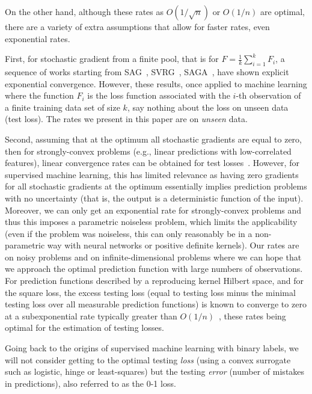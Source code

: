 \documentclass[final]{colt2018} %
\begin{document}
On the other hand, although these rates as $O(1/\sqrt{n})$ or $O(1/n)$ are optimal, there are a variety of extra assumptions that allow for faster rates, even exponential rates.

 First, for stochastic gradient from a finite pool, that is for $F= \frac{1}{k} \sum_{i=1}^k F_i$,   a sequence of  works starting from SAG~\citep{roux2012stochastic}, SVRG~\citep{johnson2013accelerating}, SAGA~\citep{defazio2014saga}, have shown explicit exponential convergence. However, these results, once applied to machine learning where the function $F_i$ is the loss function associated with the $i$-th observation of a finite training data set of size $k$, say nothing about the loss on unseen data (test loss). The rates we present in this paper are on \emph{unseen} data.

 Second, assuming that at the optimum all stochastic gradients are equal to zero, then for strongly-convex problems (e.g., linear predictions with low-correlated features), linear convergence rates can be obtained for test losses~\citep{solodov1998incremental,schmidt2013fast}. However, for supervised machine learning, this has limited relevance as having zero gradients for all stochastic gradients at the optimum essentially implies prediction problems with no uncertainty (that is, the output is a deterministic function of the input). Moreover, we can only get an exponential rate for strongly-convex problems and thus this imposes a parametric noiseless problem, which limits the applicability (even if the problem was noiseless, this can only reasonably be in a non-parametric way with neural networks or positive definite kernels). Our rates are   on noisy problems and on infinite-dimensional problems where we can hope that we approach the optimal prediction function with large numbers of observations. For prediction functions described by a reproducing kernel Hilbert space, and for the square loss, the excess testing loss  (equal to testing loss minus the minimal testing loss over all measurable prediction functions) is known to converge to zero at a subexponential rate typically greater than $O(1/n)$~\citep{dieuleveut2016nonparametric,daft}, these rates being optimal for the estimation of testing losses.
 
 
 
 Going back to the origins of supervised machine learning with binary labels, we will not consider getting to the optimal  testing \emph{loss} (using a  convex surrogate such as logistic, hinge or least-squares) but the testing \emph{error} (number of mistakes in predictions), also referred to as the 0-1 loss.
\end{document}
